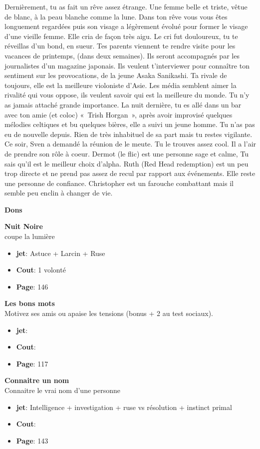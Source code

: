 \documentclass[oneside,12pt]{book}
\newcommand\don[5]{
\textbf{#1} \\
#2
\begin{itemize}
\item{ \textbf{jet}: #3}
\item{ \textbf{Cout}: #4}
\item{ \textbf{Page}: #5}
\end{itemize}
\vspace{0.5cm}
}
\begin{document}
\begin{flushleft}
\begin{description}
{Dernièrement, tu as fait un rêve assez étrange. Une femme belle et triste, vêtue  de blanc, à la peau blanche comme la lune.  Dans ton rêve vous vous êtes longuement regardées puis son visage a légèrement évolué pour former le visage d'une vieille femme. Elle cria de façon très aigu. Le cri fut douloureux, tu te réveillas d'un bond, en sueur. 
Tes parents viennent te rendre visite pour les vacances de printemps, (dans deux semaines). Ils seront accompagnés par les journalistes d'un magazine japonais. Ils veulent t'interviewer pour connaître ton sentiment sur les provocations, de la jeune Asaka Sanikashi. 
Ta rivale de toujours, elle est la meilleure violoniste d'Asie. Les média semblent aimer la rivalité qui vous oppose, ils veulent savoir qui est la meilleure du monde. Tu n'y as jamais attaché grande importance. 
La nuit dernière, tu es allé dans un bar avec ton amie (et coloc) « Trish Horgan », après avoir improvisé quelques mélodies celtiques et bu quelques bières, elle a suivi un jeune homme. Tu n'as pas eu de nouvelle depuis. Rien de très inhabituel de sa part mais tu restes vigilante. \\ 

Ce soir, Sven a demandé la réunion de le meute. Tu le trouves assez cool. Il a l'air de prendre son rôle à coeur. Dermot (le flic) est une personne sage et calme, Tu sais qu'il est le meilleur choix d'alpha. Ruth (Red Head redemption) est un peu trop directe et ne prend pas assez de recul par rapport aux événements. Elle reste une personne de confiance. Christopher est un farouche combattant mais il semble peu enclin à changer de vie.\\ 
}
\end{description}
\clearpage
\textbf{\large Dons} 
\vspace{0.5cm}



\don{Nuit Noire}{coupe la lumière }{Astuce + Larcin + Ruse}{1 volonté}{146}
\don{Les bons mots}{Motivez ses amis ou apaise les tensions (bonus + 2 au test sociaux).}{}{}{117}
\don{Connaitre un nom}{Connaitre le vrai nom d'une personne}{Intelligence + investigation + ruse vs résolution + instinct primal}{}{143}

\clearpage

\end{flushleft}
\end{document}
